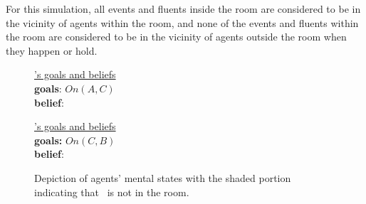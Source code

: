 For this simulation, all events and fluents inside the room are
considered to be in the vicinity of agents within the room, and none
of the events and fluents within the room are considered to be in the
vicinity of agents outside the room when they happen or hold.

\begin{figure}
  \begin{center}
    \begin{minipage}[b]{0.25\textwidth}
      \begin{flushleft}   
        \begin{footnotesize} \underline{\humana's goals and beliefs}\\
          \vspace{4pt}
          \textbf{goals}: $On(A,C)$\\
          \vspace{-4pt}
          \textbf{belief}:
        \end{footnotesize}
      \end{flushleft}    
      \begin{center} 
      \end{center}
    \end{minipage}
   \hspace{50pt}
    \begin{minipage}[b]{0.25\textwidth}
      \begin{flushleft} 
        \begin{footnotesize} \underline{\humanb's  goals and beliefs}\\                          
          \vspace{4pt}
          \textbf{goals:} $On(C,B)$\\
          \vspace{-4pt}
          \textbf{belief}:
        \end{footnotesize}
      \end{flushleft}   
    \end{minipage}
  \end{center}
  \caption{Depiction of agents' mental states with the shaded portion indicating that \humanb\ is not in the room.}
  \label{fig:mom-example}
\end{figure}
 
